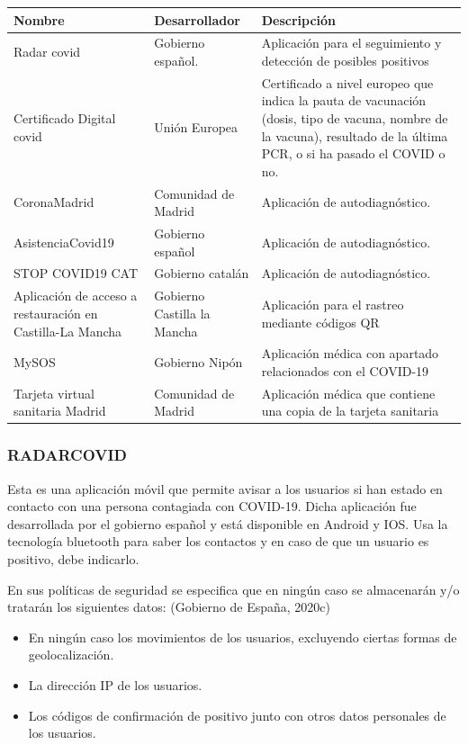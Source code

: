 \documentclass[11pt,a4paper,spanish]{article}
\begin{document}
\begin{tabular}{p{4cm} p{4cm}p{5cm}}
\textbf{Nombre} & \textbf{Desarrollador} & \textbf{Descripción}  \\ \hline
Radar covid              & Gobierno español.     & Aplicación para el seguimiento y detección de posibles positivos      \\ \hline
Certificado Digital covid              & Unión Europea     & Certificado a nivel europeo que indica la pauta de vacunación (dosis, tipo de vacuna, nombre de la vacuna), resultado de la última PCR, o si ha pasado el COVID o no.    \\ \hline
CoronaMadrid              & Comunidad de Madrid    & Aplicación de autodiagnóstico.     \\ \hline
AsistenciaCovid19              & Gobierno español    & Aplicación de autodiagnóstico.    \\ \hline
STOP COVID19 CAT              & Gobierno catalán     & Aplicación de autodiagnóstico.     \\ \hline
Aplicación de acceso a restauración en Castilla-La Mancha              & Gobierno Castilla la Mancha    & Aplicación para el rastreo mediante códigos QR     \\ \hline
MySOS              & Gobierno Nipón     & Aplicación médica con apartado relacionados con el COVID-19     \\ \hline
Tarjeta virtual sanitaria Madrid              & Comunidad de Madrid     & Aplicación médica que contiene una copia de la tarjeta sanitaria 
\end{tabular}

\subsubsection{RADARCOVID}
Esta es una aplicación móvil que permite avisar a los usuarios si han estado en contacto con una persona contagiada con COVID-19. Dicha aplicación fue desarrollada por el gobierno español y está disponible en Android y IOS. Usa la tecnología bluetooth para saber los contactos y en caso de que un usuario es positivo, debe indicarlo.

En sus políticas de seguridad se especifica que en ningún caso se almacenarán y/o tratarán los siguientes datos: (Gobierno de España, 2020c)

\begin{itemize}
\item En ningún caso los movimientos de los usuarios, excluyendo ciertas formas de geolocalización.
\item La dirección IP de los usuarios.
\item Los códigos de confirmación de positivo junto con otros datos personales de los usuarios.
\end{itemize}
\end{document}
